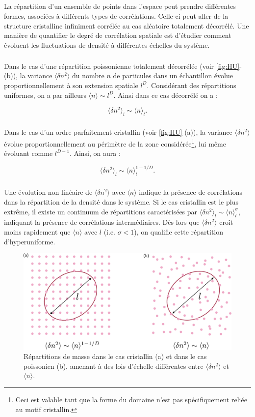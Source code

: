 \subparagraph{}La répartition d'un ensemble de points dans l'espace peut prendre différentes formes, associées à différents types de corrélations. Celle-ci peut aller de la structure cristalline infiniment corrélée au cas aléatoire totalement décorrélé. Une manière de quantifier le degré de corrélation spatiale est d'étudier comment évoluent les fluctuations de densité à différentes échelles du système. 

\subparagraph{}Dans le cas d'une répartition poissonienne totalement décorrélée (voir \autoref{fig:HU}-(b)), la variance $\langle \delta n^2 \rangle$ du nombre $n$ de particules dans un échantillon évolue proportionnellement à son extension spatiale $l^D$. Considérant des répartitions uniformes, on a par ailleurs $\langle n \rangle \sim l^D$. Ainsi dans ce cas décorrélé on a :

\begin{equation}
	\langle \delta n^2 \rangle_l \sim \langle n \rangle_l.
\end{equation} 

\subparagraph{}Dans le cas d'un ordre parfaitement cristallin (voir \autoref{fig:HU}-(a)), la variance $\langle \delta n^2 \rangle$ évolue proportionnellement au périmètre de la zone considérée\footnote{Ceci est valable tant que la forme du domaine n'est pas spécifiquement reliée au motif cristallin.}, lui même évoluant comme $l^{D-1}$. Ainsi, on aura :

\begin{equation}
	\langle \delta n^2 \rangle_l \sim \langle n \rangle_l^{1-1/D}.
\end{equation} 

\subparagraph{}Une évolution non-linéaire de $\langle \delta n^2 \rangle$ avec $\langle n \rangle$ indique la présence de corrélations dans la répartition de la densité dans le système. Si le cas cristallin est le plus extrême, il existe un continuum de répartitions caractérisées par $\langle \delta n^2 \rangle_l \sim \langle n \rangle_l^{\sigma}$, indiquant la présence de corrélations intermédiaires. Dès lors que $\langle \delta n^2 \rangle$ croît moins rapidement que $\langle n \rangle$ avec $l$ (i.e. $\sigma < 1$), on qualifie cette répartition d'hyperuniforme.

\begin{figure}[h]
	\centering
	\includegraphics[width=\textwidth]{Chapitre1/Figures/CDP/hyperuniformite.pdf}
	\caption{Répartitions de masse dans le cas cristallin (a) et dans le cas poissonien (b), amenant à des lois d'échelle différentes entre $\langle \delta n^2 \rangle$ et $\langle n \rangle$.}
	\label{fig:HU}
\end{figure}

